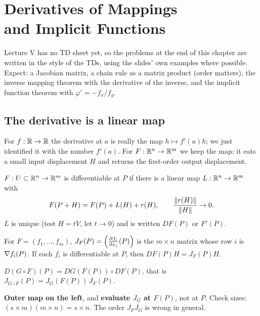 \chapter[Derivatives of Mappings]{Derivatives of Mappings\\ and Implicit Functions}\label{ch:five}

\begin{examnote}
Lecture V has no TD sheet yet, so the problems at the end of this chapter are written in the
style of the TDs, using the slides' own examples where possible. Expect: a Jacobian matrix,
a chain rule as a matrix product (order matters), the inverse mapping theorem with the
derivative of the inverse, and the implicit function theorem with $\varphi'=-f_x/f_y$.
\end{examnote}

\section{The derivative is a linear map}

\begin{intuition}
For $f:\mathbb{R}\to\mathbb{R}$ the derivative at $a$ is really the map $h\mapsto f'(a)h$; we just identified
it with the number $f'(a)$. For $F:\mathbb{R}^n\to\mathbb{R}^m$ we keep the map: it eats a small input
displacement $H$ and returns the first-order output displacement.
\end{intuition}

\begin{defi}
$F:U\subset\mathbb{R}^n\to\mathbb{R}^m$ is differentiable at $P$ if there is a linear map $L:\mathbb{R}^n\to\mathbb{R}^m$ with
\[ F(P+H)=F(P)+L(H)+r(H),\qquad \frac{\left\lVert r(H)\right\rVert}{\left\lVert H\right\rVert}\to0 . \]
$L$ is unique (test $H=tV$, let $t\to0$) and is written $DF(P)$ or $F'(P)$.
\end{defi}

\begin{defi}
For $F=(f_1,\dots,f_m)$, $J_F(P)=\left(\frac{\partial f_i}{\partial x_j}(P)\right)$ is the $m\times n$ matrix whose
row $i$ is $\nabla f_i(P)$. If each $f_i$ is differentiable at $P$, then $DF(P)H=J_F(P)H$.
\end{defi}

\begin{thm}
$D(G\circ F)(P)=DG(F(P))\circ DF(P)$, that is $J_{G\circ F}(P)=J_G(F(P))\,J_F(P)$.
\end{thm}

\begin{trap}
\textbf{Outer map on the left}, and \textbf{evaluate $J_G$ at $F(P)$}, not at $P$. Check sizes:
$(s\times m)(m\times n)=s\times n$. The order $J_FJ_G$ is wrong in general.
\end{trap}


